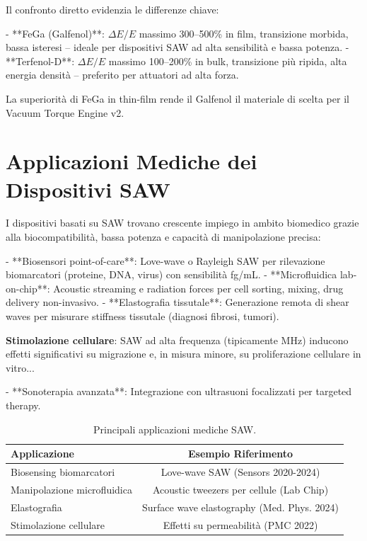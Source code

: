 \documentclass[11pt,a4paper]{article}
\begin{document}
Il confronto diretto evidenzia le differenze chiave:

- **FeGa (Galfenol)**: $\Delta E/E$ massimo 300–500\% in film, transizione morbida, bassa isteresi – ideale per dispositivi SAW ad alta sensibilità e bassa potenza.
- **Terfenol-D**: $\Delta E/E$ massimo 100–200\% in bulk, transizione più ripida, alta energia densità – preferito per attuatori ad alta forza.

La superiorità di FeGa in thin-film rende il Galfenol il materiale di scelta per il Vacuum Torque Engine v2.


\section{Applicazioni Mediche dei Dispositivi SAW}

I dispositivi basati su SAW trovano crescente impiego in ambito biomedico grazie alla biocompatibilità, bassa potenza e capacità di manipolazione precisa:

- **Biosensori point-of-care**: Love-wave o Rayleigh SAW per rilevazione biomarcatori (proteine, DNA, virus) con sensibilità fg/mL.
- **Microfluidica lab-on-chip**: Acoustic streaming e radiation forces per cell sorting, mixing, drug delivery non-invasivo.
- **Elastografia tissutale**: Generazione remota di shear waves per misurare stiffness tissutale (diagnosi fibrosi, tumori).
\item \textbf{Stimolazione cellulare}: SAW ad alta frequenza (tipicamente MHz) inducono effetti significativi su migrazione e, in misura minore, su proliferazione cellulare in vitro...

- **Sonoterapia avanzata**: Integrazione con ultrasuoni focalizzati per targeted therapy.

\begin{table}[h]
\centering
\begin{tabular}{lc}
\toprule
Applicazione & Esempio Riferimento \\
\midrule
Biosensing biomarcatori & Love-wave SAW (Sensors 2020-2024) \\
Manipolazione microfluidica & Acoustic tweezers per cellule (Lab Chip) \\
Elastografia & Surface wave elastography (Med. Phys. 2024) \\
Stimolazione cellulare & Effetti su permeabilità (PMC 2022) \\
\bottomrule
\end{tabular}
\caption{Principali applicazioni mediche SAW.}
\end{table}
\end{document}

